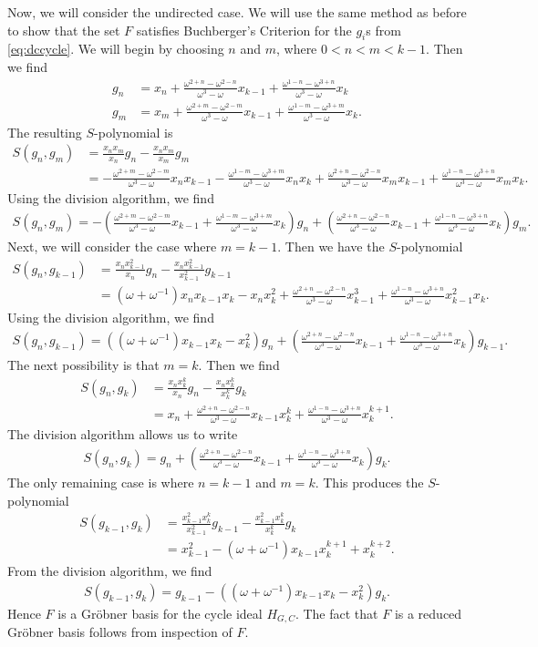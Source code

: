 \documentclass{amsart}
\renewcommand{\(}{\left(}
\renewcommand{\)}{\right)}
\newcommand{\<}{\langle}
\renewcommand{\>}{\rangle}
\newcommand{\aln}[1]{\begin{align*} #1 \end{align*}} %
\newcommand{\fitp}[1]{\left( #1 \right)} %
\theoremstyle{definition}
\theoremstyle{remark}
\begin{document}
Now, we will consider the undirected case. We will use the same method as before to show that the set $F$ satisfies Buchberger's Criterion for the $g_i$s from \eqref{eq:dccycle}. We will begin by choosing $n$ and $m$, where $0 < n < m < k-1$. Then we find
\aln{
  g_n &= x_n + \frac{\omega^{2+n} - \omega^{2-n}}{\omega^3-\omega} x_{k-1} + \frac{\omega^{1-n} - \omega^{3+n}}{\omega^3 - \omega} x_k\\
  g_m &= x_m + \frac{\omega^{2+m} - \omega^{2-m}}{\omega^3-\omega} x_{k-1} + \frac{\omega^{1-m} - \omega^{3+m}}{\omega^3 - \omega} x_k.
}
The resulting $S$-polynomial is
\aln{
  S(g_n, g_m) &= \frac{x_n x_m}{x_n} g_n - \frac{x_n x_m}{x_m} g_m\\
  &= - \frac{\omega^{2+m} - \omega^{2-m}}{\omega^3-\omega} x_n x_{k-1} - \frac{\omega^{1-m} - \omega^{3+m}}{\omega^3 - \omega} x_n x_k + \frac{\omega^{2+n} - \omega^{2-n}}{\omega^3-\omega} x_m x_{k-1} + \frac{\omega^{1-n} - \omega^{3+n}}{\omega^3 - \omega} x_m x_k.
}
Using the division algorithm, we find
\aln{
  S(g_n, g_m) = -\fitp{\frac{\omega^{2+m} - \omega^{2-m}}{\omega^3-\omega} x_{k-1} + \frac{\omega^{1-m} - \omega^{3+m}}{\omega^3 - \omega} x_k} g_n + \fitp{\frac{\omega^{2+n} - \omega^{2-n}}{\omega^3-\omega} x_{k-1} + \frac{\omega^{1-n} - \omega^{3+n}}{\omega^3 - \omega} x_k} g_m.
}
Next, we will consider the case where $m = k-1$. Then we have the $S$-polynomial
\aln{
  S(g_n, g_{k-1}) &= \frac{x_n x_{k-1}^2}{x_n} g_n - \frac{x_n x_{k-1}^2}{x_{k-1}^2} g_{k-1}\\
  &= (\omega + \omega^{-1}) x_n x_{k-1} x_k - x_n x_k^2 + \frac{\omega^{2+n} - \omega^{2-n}}{\omega^3 - \omega} x_{k-1}^3 + \frac{\omega^{1-n} - \omega^{3+n}}{\omega^3 - \omega} x_{k-1}^2 x_k.
}
Using the division algorithm, we find
\aln{
  S(g_n, g_{k-1}) = \fitp{(\omega + \omega^{-1}) x_{k-1} x_k - x_k^2} g_n + \fitp{\frac{\omega^{2+n} - \omega^{2-n}}{\omega^3 - \omega} x_{k-1} + \frac{\omega^{1-n} - \omega^{3+n}}{\omega^3 - \omega} x_k} g_{k-1}.
}
The next possibility is that $m = k$. Then we find
\aln{
  S(g_n, g_k) &= \frac{x_n x_k^k}{x_n} g_n - \frac{x_n x_k^k}{x_k^k} g_k\\
  &= x_n + \frac{\omega^{2+n} - \omega^{2-n}}{\omega^3 - \omega} x_{k-1} x_k^k + \frac{\omega^{1-n} - \omega^{3+n}}{\omega^3 - \omega} x_k^{k+1}.
}
The division algorithm allows us to write
\aln{
  S(g_n, g_k) = g_n + \fitp{\frac{\omega^{2+n} - \omega^{2-n}}{\omega^3 - \omega} x_{k-1} + \frac{\omega^{1-n} - \omega^{3+n}}{\omega^3 - \omega} x_k} g_k.
}
The only remaining case is where $n = k - 1$ and $m = k$. This produces the $S$-polynomial
\aln{
  S(g_{k-1}, g_k) &= \frac{x_{k-1}^2 x_k^k}{x_{k-1}^2} g_{k-1} - \frac{x_{k-1}^2 x_k^k}{x_k^k} g_k\\
  &= x_{k-1}^2 - (\omega + \omega^{-1}) x_{k-1} x_k^{k+1} + x_k^{k+2}.
}
From the division algorithm, we find
\aln{
  S(g_{k-1}, g_k) = g_{k-1} - \fitp{(\omega + \omega^{-1}) x_{k-1} x_k - x_k^2} g_k.
}
Hence $F$ is a Gr\"obner basis for the cycle ideal $H_{G,C}$. The fact that $F$ is a reduced Gr\"obner basis follows from inspection of $F$.
\end{document}
